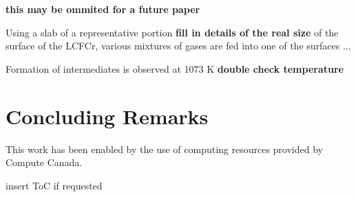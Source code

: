 \documentclass[journal=jpcafh,manuscript=article]{achemso}
\begin{document}
\textbf{this may be ommited for a future paper}

Using a slab of a representative portion \textbf{fill in details of the real size} of the surface of the LCFCr, various mixtures of gases are fed into one of the surfaces ...

Formation of intermediates is observed at 1073 K \textbf{double check temperature}

\section{Concluding Remarks}
\label{sec:conclusions}


\begin{acknowledgement}
This work has been enabled by the use of computing resources provided by Compute Canada.
\end{acknowledgement}

\pagebreak



\pagebreak
\begin{tocentry}
\begin{center}
insert ToC if requested
\end{center}
\end{tocentry}
\end{document}
